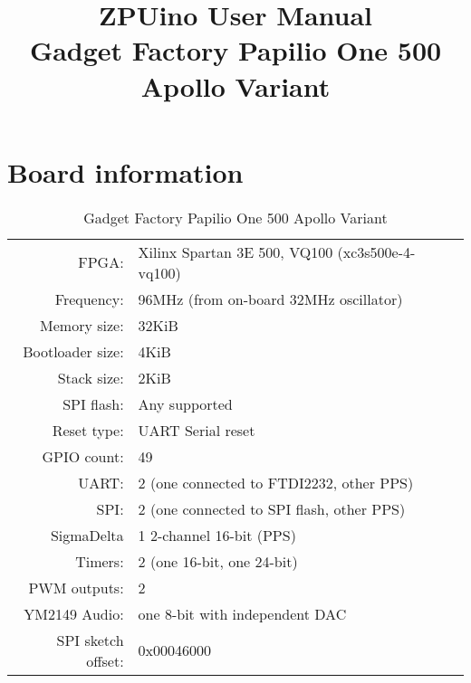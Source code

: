 \documentclass[12pt,a4paper,openany,smallheadings,headinclude,headsepline,final]{scrreprt}
\def \board {Gadget Factory Papilio One 500 Apollo Variant }
\begin{document}

\parindent 0cm
\parskip 0.2cm

\title{ZPUino User Manual\\ \board }
\maketitle

\tableofcontents
\clearpage

\chapter{Board information}

\begin{table}[H]
\begin{center}
\begin{tabularx}{14cm}{rX}
FPGA:              & Xilinx Spartan 3E 500, VQ100 (xc3s500e-4-vq100)\\
Frequency:         & 96MHz (from on-board 32MHz oscillator)\\
Memory size:       & 32KiB \\
Bootloader size:   & 4KiB \\
Stack size:        & 2KiB \\
SPI flash:         & Any supported \\
Reset type:        & UART Serial reset \\
GPIO count:        & 49 \\
UART:              & 2 (one connected to FTDI2232, other PPS) \\
SPI:               & 2 (one connected to SPI flash, other PPS) \\
SigmaDelta         & 1 2-channel 16-bit (PPS) \\
Timers:            & 2 (one 16-bit, one 24-bit) \\
PWM outputs:       & 2     \\
YM2149 Audio:      & one 8-bit with independent DAC \\
SPI sketch offset: & 0x00046000
\end{tabularx}
\caption{\board}
\end{center}
\end{table}
\end{document}
